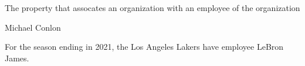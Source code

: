 \documentclass[letterpaper,10pt,english]{sphinxmanual}
\begin{document}
\begin{sphinxShadowBox}

\sphinxAtStartPar
{}
\end{sphinxShadowBox}

\begin{sphinxShadowBox}

\sphinxAtStartPar
The property that assocates an organization with an employee of the organization
\end{sphinxShadowBox}

\begin{sphinxShadowBox}

\sphinxAtStartPar
Michael Conlon 
\end{sphinxShadowBox}

\begin{sphinxShadowBox}

\sphinxAtStartPar
{\hyperref[\detokenize{doc-ORG_0000001::doc}]{}}
\end{sphinxShadowBox}

\begin{sphinxShadowBox}

\sphinxAtStartPar
{\hyperref[\detokenize{doc-NCBITaxon_9606::doc}]{}}
\end{sphinxShadowBox}

\begin{sphinxShadowBox}

\sphinxAtStartPar
{\hyperref[\detokenize{doc-ORG_2000017::doc}]{}}
\end{sphinxShadowBox}

\begin{sphinxShadowBox}

\sphinxAtStartPar
For the season ending in 2021, the Los Angeles Lakers have employee LeBron James.
\end{sphinxShadowBox}

\begin{sphinxShadowBox}

\sphinxAtStartPar
{}
\end{sphinxShadowBox}
\end{document}
